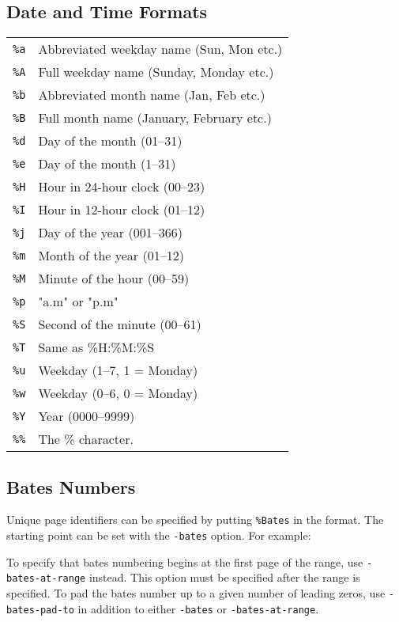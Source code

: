 \documentclass{book}
\begin{document}
  \subsection{Date and Time Formats}
  \begin{tabular}{ll}
    \texttt{\%a} & Abbreviated weekday name (Sun, Mon etc.)\\
    \texttt{\%A} & Full weekday name (Sunday, Monday etc.)\\
    \texttt{\%b} & Abbreviated month name (Jan, Feb etc.)\\
    \texttt{\%B} & Full month name (January, February etc.)\\
    \texttt{\%d} & Day of the month (01--31) \\
    \texttt{\%e} & Day of the month (1--31) \\
    \texttt{\%H} & Hour in 24-hour clock (00--23)\\
    \texttt{\%I} & Hour in 12-hour clock (01--12)\\
    \texttt{\%j} & Day of the year (001--366)\\
    \texttt{\%m} & Month of the year (01--12)\\
    \texttt{\%M} & Minute of the hour (00--59)\\
    \texttt{\%p} & "a.m" or "p.m"\\
    \texttt{\%S} & Second of the minute (00--61)\\
    \texttt{\%T} & Same as \%H:\%M:\%S\\
    \texttt{\%u} & Weekday (1--7, 1 = Monday)\\
    \texttt{\%w} & Weekday (0--6, 0 = Monday)\\
    \texttt{\%Y} & Year (0000--9999)\\
    \texttt{\%\%} & The \% character.
  \end{tabular}


  \subsection{Bates Numbers}
  Unique page identifiers can be specified by putting \verb!%Bates! in the format.
The starting point can be set with the \texttt{-bates} option. For example:

\noindent{}

To specify that bates numbering begins at the first page of the range, use \texttt{-bates-at-range} instead. This option must be specified after the range is specified. To pad the bates number up to a given number of leading zeros, use \texttt{-bates-pad-to} in addition to either \texttt{-bates} or \texttt{-bates-at-range}.
\end{document}
